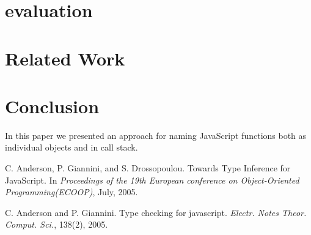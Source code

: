 \documentclass{acm_proc_article-sp}
\begin{document}
{\section{evaluation}



\section{Related Work}










\section{Conclusion}
In this paper we presented an approach for naming JavaScript functions both
as individual objects and in call stack. 



%

%
%
%

\begin{thebibliography}{10}

C. Anderson, P. Giannini, and S. Drossopoulou. \newblock Towards Type Inference for JavaScript.
\newblock In \emph{Proceedings of the 19th European conference on Object-Oriented Programming(ECOOP)},
July, 2005.

C. Anderson and P. Giannini. \newblock Type checking for javascript.
\newblock \emph{Electr. Notes Theor. Comput. Sci.}, 138(2), 2005. 


\end{thebibliography}}
\end{document}
